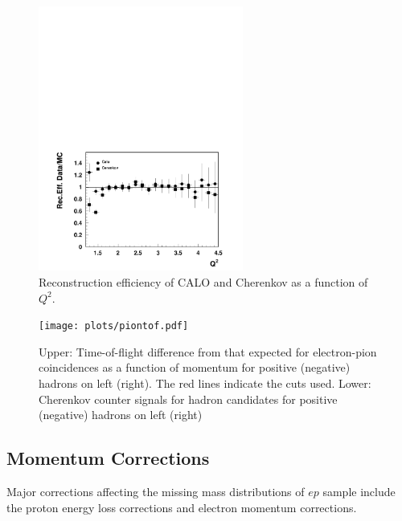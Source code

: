 \documentclass[11pt,a4paper]{article}
\begin{document}
\begin{figure}[hptb]
\centering
\includegraphics[width=0.6\textwidth]{plots/e16recefficiency.pdf}
   \caption{Reconstruction efficiency of CALO and Cherenkov as a function of  $Q^2$.}
 \label{fig:e16recefficiency}
\end{figure}

\begin{figure}[hbt]
\texttt{[image: plots/piontof.pdf]}
\caption{Upper: Time-of-flight difference from that expected
for electron-pion coincidences as a function of momentum
for positive (negative) hadrons on left (right). The red lines
indicate the cuts used. Lower: Cherenkov counter signals 
for hadron candidates for positive (negative) hadrons on left (right) }
\label{pidpi}
\end{figure}

\subsection{Momentum Corrections}

Major corrections affecting the missing mass distributions of $ep$ sample
include the proton energy loss corrections and electron momentum corrections.
 
\end{document}

